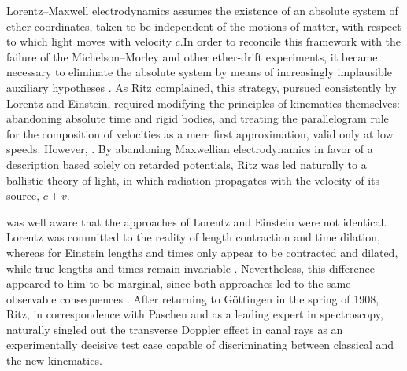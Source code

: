 \documentclass[pdflatex,sn-basic]{sn-jnl}
\begin{document}
Lorentz--Maxwell electrodynamics assumes the existence of an absolute system of ether coordinates, taken to be independent of the motions of matter, with respect to which light moves with velocity $c$.In order to reconcile this framework with the failure of the Michelson--Morley and other ether-drift experiments, it became necessary to eliminate the absolute system by means of increasingly implausible auxiliary hypotheses \citep[148]{Ritz1908a}. As Ritz complained, this strategy, pursued consistently by Lorentz and Einstein, required modifying the principles of kinematics themselves: abandoning absolute time and rigid bodies, and treating the parallelogram rule for the composition of velocities as a mere first approximation, valid only at low speeds. However,  \citep[148]{Ritz1908a}. By abandoning Maxwellian electrodynamics in favor of a description based solely on retarded potentials, Ritz was led naturally to a ballistic theory of light, in which radiation propagates with the velocity of its source, $c \pm v$.


\citet[203]{Ritz1908} was well aware that the approaches of Lorentz and Einstein were not identical. Lorentz was committed to the reality  of length contraction and time dilation, whereas for Einstein lengths and times only appear  to be contracted and dilated, while true lengths and times remain invariable \citep[203]{Ritz1908}. Nevertheless, this difference appeared to him to be marginal, since both approaches led to the same observable consequences \citet[213]{Ritz1908b}. After returning to Göttingen in the spring of 1908, Ritz, in correspondence with Paschen and as a leading expert in spectroscopy, naturally singled out the transverse Doppler effect in canal rays as an experimentally decisive test case capable of discriminating between classical and the new kinematics.
\end{document}
